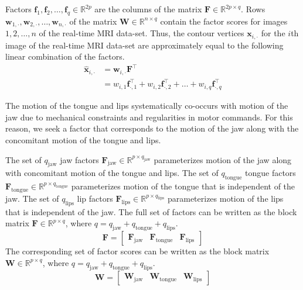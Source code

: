 \documentclass[preprint]{JASAnew}\usepackage[]{graphicx}\usepackage[]{color}
\begin{document}
Factors $\mathbf{f}_1, \mathbf{f}_2, \ldots, \mathbf{f}_q \in \mathbb{R}^{2p}$ are the columns of the matrix $\mathbf{F} \in \mathbb{R}^{2p\times q}$. 
%
Rows $\mathbf{w}_{1,\cdot},\mathbf{w}_{2,\cdot},\ldots,\mathbf{w}_{n,\cdot}$ of the matrix $\mathbf{W} \in \mathbb{R}^{n\times q}$ contain the factor scores for images $1,2,\ldots,n$ of the real-time MRI data-set. 
%
Thus, the contour vertices $\mathbf{x}_{i,\cdot}$ for the $i$th image of the real-time MRI data-set are approximately equal to the following linear combination of the factors. 
%
\begin{align}
\label{eq:linearcombo}
\mathbf{\hat{x}}_{i,\cdot}
 &=
  \mathbf{w}_{i,\cdot} \mathbf{F}^\intercal \\
 &=
  w_{i,1} \mathbf{f}_{\cdot,1}^\intercal
  + w_{i,2} \mathbf{f}_{\cdot,2}^\intercal
  + \ldots
  + w_{i,q} \mathbf{f}_{\cdot,q}^\intercal
\end{align}




The motion of the tongue and lips systematically co-occurs with motion of the jaw due to mechanical constraints and regularities in motor commands. For this reason, we seek a factor that corresponds to the motion of the jaw along with the concomitant motion of the tongue and lips.


The set of $q_\text{jaw}$ jaw factors $\mathbf{F}_\text{jaw} \in \mathbb{R}^{p\times q_\text{jaw}}$ parameterizes motion of the jaw along with concomitant motion of the tongue and lips.
%
The set of $q_\text{tongue}$ tongue factors $\mathbf{F}_\text{tongue} \in \mathbb{R}^{p\times q_\text{tongue}}$ parameterizes motion of the tongue that is independent of the jaw. 
%
The set of $q_\text{lips}$ lip factors $\mathbf{F}_\text{lips} \in \mathbb{R}^{p\times q_\text{lips}}$ parameterizes motion of the lips that is independent of the jaw.
%
The full set of factors can be written as the block matrix $\mathbf{F} \in \mathbb{R}^{p\times q}$, where $q=q_\text{jaw}+q_\text{tongue}+q_\text{lips}$. 
% 
\begin{equation}
\label{eq:Fblock}
\mathbf{F} = 
\left[
\begin{array}{c|c|c}
\mathbf{F}_\text{jaw} 
& \mathbf{F}_\text{tongue}
& \mathbf{F}_\text{lips}
\end{array}
\right]
\end{equation}
%
The corresponding set of factor scores can be written as the block matrix $\mathbf{W} \in \mathbb{R}^{p\times q}$, where $q=q_\text{jaw}+q_\text{tongue}+q_\text{lips}$. 
% 
\begin{equation}
\label{eq:Wblock}
\mathbf{W} = 
\left[
\begin{array}{c|c|c}
\mathbf{W}_\text{jaw} 
& \mathbf{W}_\text{tongue}
& \mathbf{W}_\text{lips}
\end{array}
\right]
\end{equation}
\end{document}
